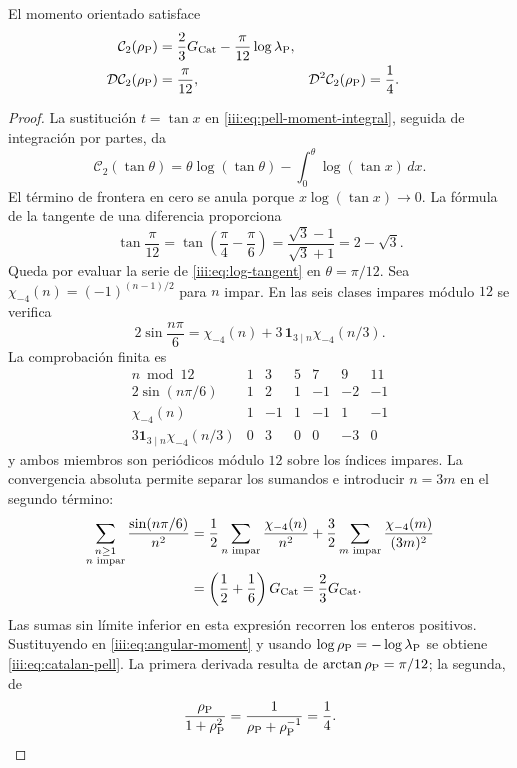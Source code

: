 \begin{theorem}
\label{iii:thm:catalan-pell}
El momento orientado satisface
\begin{align}
 \mathcal C_2(\rho_{\rm P})
 &=\frac23G_{\rm Cat}-\frac{\pi}{12}\log\lambda_{\rm P},
 \label{iii:eq:catalan-pell}\\
 \mathcal D\mathcal C_2(\rho_{\rm P})&=\frac{\pi}{12},&
 \mathcal D^2\mathcal C_2(\rho_{\rm P})&=\frac14.
 \label{iii:eq:catalan-pell-derivatives}
\end{align}
\end{theorem}
\begin{proof}
La sustitución $t=\tan x$ en \eqref{iii:eq:pell-moment-integral},
seguida de integración por partes, da
\begin{equation}
 \mathcal C_2(\tan\theta)
 =\theta\log(\tan\theta)
   -\int_0^\theta\log(\tan x)\,dx.
 \label{iii:eq:angular-moment}
\end{equation}
El término de frontera en cero se anula porque $x\log(\tan x)\to0$.
La fórmula de la tangente de una diferencia proporciona
\[
 \tan\frac{\pi}{12}
 =\tan\left(\frac\pi4-\frac\pi6\right)
 =\frac{\sqrt3-1}{\sqrt3+1}=2-\sqrt3.
\]
Queda por evaluar la serie de \eqref{iii:eq:log-tangent} en
$\theta=\pi/12$. Sea $\chi_{-4}(n)=(-1)^{(n-1)/2}$ para $n$ impar.
En las seis clases impares módulo $12$ se verifica
\begin{equation}
 2\sin\frac{n\pi}{6}
 =\chi_{-4}(n)+3\,\mathbf1_{3\mid n}\chi_{-4}(n/3).
 \label{iii:eq:character-pell}
\end{equation}
La comprobación finita es
\[
\begin{array}{c|rrrrrr}
 n\bmod12&1&3&5&7&9&11\\ \hline
 2\sin(n\pi/6)&1&2&1&-1&-2&-1\\
 \chi_{-4}(n)&1&-1&1&-1&1&-1\\
 3\mathbf1_{3\mid n}\chi_{-4}(n/3)&0&3&0&0&-3&0
\end{array}
\]
y ambos miembros son periódicos módulo $12$ sobre los índices impares.
La convergencia absoluta permite separar los sumandos e introducir $n=3m$
en el segundo término:
\begin{align*}
 \sum_{\substack{n\geq1\\n\text{ impar}}}
       \frac{\sin(n\pi/6)}{n^2}
 &=\frac12\sum_{n\text{ impar}}\frac{\chi_{-4}(n)}{n^2}
  +\frac32\sum_{m\text{ impar}}\frac{\chi_{-4}(m)}{(3m)^2}\\
 &=\left(\frac12+\frac16\right)G_{\rm Cat}
 =\frac23G_{\rm Cat}.
\end{align*}
Las sumas sin límite inferior en esta expresión recorren los enteros
positivos. Sustituyendo en \eqref{iii:eq:angular-moment} y usando
$\log\rho_{\rm P}=-\log\lambda_{\rm P}$ se obtiene
\eqref{iii:eq:catalan-pell}. La primera derivada resulta de
$\arctan\rho_{\rm P}=\pi/12$; la segunda, de
\[
 \frac{\rho_{\rm P}}{1+\rho_{\rm P}^2}
 =\frac1{\rho_{\rm P}+\rho_{\rm P}^{-1}}=\frac14.
\]
\end{proof}

